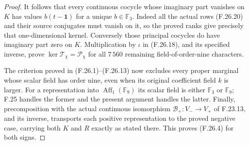 \begin{proof}
It follows that every continuous cocycle whose
imaginary part vanishes on $K$ has values
$b(t-\mathbf1)$ for a unique $b\in\mathbb F_3$.
Indeed all the actual rows (F.26.20) and their
source conjugates must vanish on it, so the
proved ranks give precisely that one-dimensional
kernel. Conversely those principal cocycles
do have imaginary part zero on $K$.
Multiplication by $\iota$ in (F.26.18), and its
specified inverse, prove
$\ker\mathscr T_\chi=\mathscr P_\chi$ for all
$7\,560$ remaining field-of-order-nine characters.

The criterion proved in (F.26.1)--(F.26.13)
now excludes every proper marginal whose
scalar field has order nine, even when its
original coefficient field $k$ is larger.
For a representation into
$\operatorname{Aff}_1(\mathbb F_9)$ its scalar
field is either $\mathbb F_3$ or $\mathbb F_9$;
F.25 handles the former and the present argument
handles the latter. Finally, precomposition
with the actual continuous isomorphism
$\mathcal B_+:V_-\to V_+$ of F.23.13, and
its inverse, transports each positive
representation to the proved negative case,
carrying both $K$ and $R$ exactly as stated
there. This proves (F.26.4) for both signs.
\end{proof}
